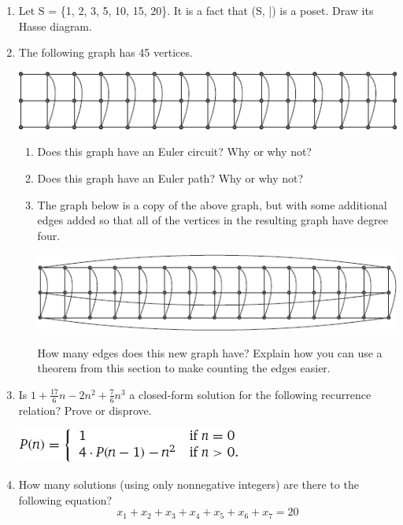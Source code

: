 \documentclass[12pt]{article}
\begin{document}
\begin{enumerate}
    \item Let S = \{1, 2, 3, 5, 10, 15, 20\}. It is a fact that (S, |) is a poset. Draw its Hasse diagram.
    \item The following graph has 45 vertices.
    \begin{center}
        \includegraphics[scale=2]{img/img-7.png}
    \end{center}
    \begin{enumerate}
        \item Does this graph have an Euler circuit? Why or why not?
        \item Does this graph have an Euler path? Why or why not?
        \item The graph below is a copy of the above graph, but with some additional edges added so that all of the vertices in the resulting graph have degree four.
        \begin{center}
            \includegraphics[scale=2]{img/img-8.png}
        \end{center}
        How many edges does this new graph have? Explain how you can use a theorem from this section to make counting the edges easier.
    \end{enumerate}

    \item Is $1 + \frac{17}{6}n - 2n^2 + \frac{7}{6}n^3$ a closed-form solution for the following recurrence relation? Prove or disprove.
    \begin{center}
        \includegraphics[scale=3]{img/img-9.png}
    \end{center}

    \item How many solutions (using only nonnegative integers) are there to the following equation?
    \[x_1 + x_2 + x_3 + x_4 + x_5 + x_6 + x_7 = 20  \]

\end{enumerate}
\end{document}
